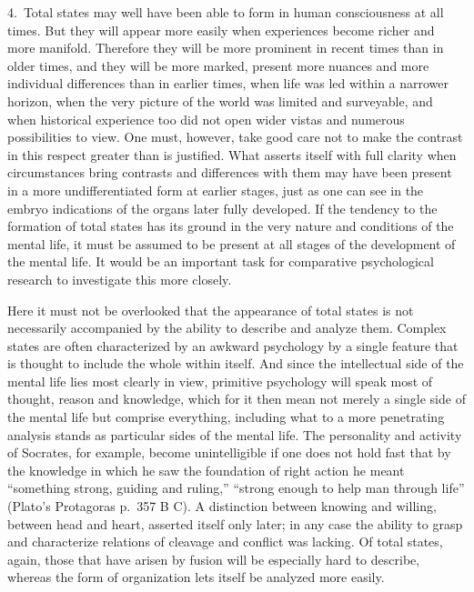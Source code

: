 \documentclass[12pt]{book}
\newcommand{\opage}[1]{\marginnote{\footnotesize\textit{[#1]}}}
\begin{document}
4.~Total states may well have been able to form in human consciousness at all
times. But they will appear more easily when experiences become richer and more
manifold. Therefore they will be more prominent in recent times than in older
times, and they will be more marked, present more nuances and more individual
differences than in earlier times, when life was led within a narrower horizon,
when the very picture of the world was limited and surveyable, and when
historical experience too did not open wider vistas and numerous possibilities to
view. One must, however, take good care not to make the contrast in this respect
greater than is justified. What asserts itself with full clarity when
circumstances bring contrasts and differences with them may have been present in
a more undifferentiated form at earlier stages, just as one can see in the embryo
indications of the organs later fully developed. If the tendency to the formation
of total states has its ground in the very nature and conditions of the mental
life, it must be assumed to be present at all stages of the development of the
mental life. It would be an important task for comparative psychological
research to investigate this more closely.

Here it must not be overlooked that the appearance of total states is not
necessarily accompanied by the ability to describe and analyze them. Complex
states are often characterized by an awkward psychology by a single feature
that is thought to include the whole within itself. And since the intellectual
side of the mental life lies most clearly in view, primitive psychology will
speak most of thought, reason and knowledge, which for it then mean not merely a
single side \opage{21}of the mental life but comprise everything, including what
to a more penetrating analysis stands as particular sides of the mental life. The
personality and activity of Socrates, for example, become unintelligible if one
does not hold fast that by the knowledge in which he saw the foundation of right
action he meant ``something strong, guiding and ruling,'' ``strong enough to help
man through life'' (Plato's Protagoras p.~357 B C). A distinction between
knowing and willing, between head and heart, asserted itself only later; in any
case the ability to grasp and characterize relations of cleavage and conflict was
lacking. Of total states, again, those that have arisen by fusion will be
especially hard to describe, whereas the form of organization lets itself be
analyzed more easily.
\end{document}
